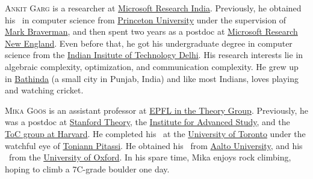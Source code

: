 \documentclass{toc}
\begin{document}
%
%
%
%
%
%
%
%
%
%
%
%
%
%
\begin{tocaboutauthors}

\begin{tocabout}[garg]

  \textsc{Ankit Garg} is a researcher at \href{https://www.microsoft.com/en-us/research/lab/microsoft-research-india/}{Microsoft Research India}. Previously, he obtained his \phd~in computer science from \href{https://www.cs.princeton.edu/}{Princeton University} under the supervision of \href{http://www.cs.princeton.edu/~mbraverm/}{Mark Braverman}, and then spent two years as a postdoc at \href{https://www.microsoft.com/en-us/research/lab/microsoft-research-new-england/}{Microsoft Research New England}. Even before that, he got his undergraduate degree in computer science from
the  %
\href{http://www.cse.iitd.ernet.in/}{Indian Insitute of Technology Delhi}. His research interests lie in algebraic complexity, optimization, and communication complexity. He grew up in \href{https://en.wikipedia.org/wiki/Bathinda}{Bathinda} (a small city in Punjab, India) and like most Indians, loves playing and watching cricket.
\end{tocabout}


\begin{tocabout}[goos]
\textsc{Mika G\"o\"os} is an assistant professor at \href{https://theory.epfl.ch/}{EPFL
in the  %
Theory Group}. Previously, he was a postdoc at \href{http://theory.stanford.edu/}{Stanford Theory},
the %
\href{https://www.ias.edu/}{Institute for Advanced Study}, and 
the %
\href{http://toc.seas.harvard.edu/}{ToC group at Harvard}. He completed his \phd~at 
the %
\href{http://www.cs.toronto.edu}{University of Toronto} under the watchful eye of \href{http://www.cs.toronto.edu/~toni/}{Toniann Pitassi}. He obtained his \bsc~from \href{https://www.aalto.fi/}{Aalto University}, and his \msc~from the \href{https://www.cs.ox.ac.uk/}{University of Oxford}. In his spare time, Mika enjoys rock climbing, hoping to climb a 7C-grade boulder one day.
\end{tocabout}


\end{tocaboutauthors}
\end{document}
